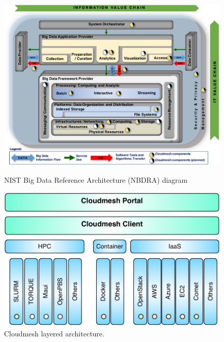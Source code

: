 \begin{figure}[hp]
  \centering
     \includegraphics[width=1.0\columnwidth]{images/nist-bda.pdf}
  \caption{NIST Big Data Reference Architecture (NBDRA) diagram} 
  \label{F:NIST-arch}


  \centering
     \includegraphics[width=1.0\columnwidth]{images/cloudmesh-arch-1.pdf}
  \caption{Cloudmesh layered architecture.} 
  \label{F:NIST-arch}


\end{figure}
